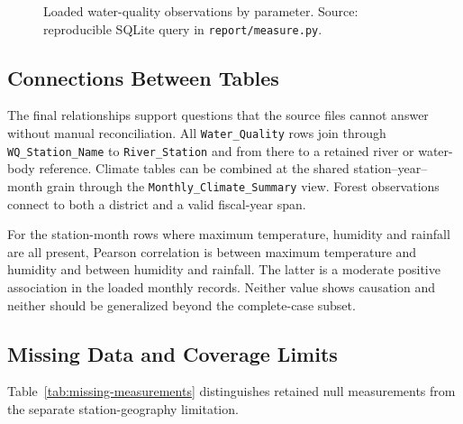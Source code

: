 \begin{figure}[H]
\centering
{}
\caption{Loaded water-quality observations by parameter. Source: reproducible
SQLite query in \texttt{report/measure.py}.}
\label{fig:water-quality-parameters}
\end{figure}

\subsection{Connections Between Tables}
\label{subsec:relationship-findings}

The final relationships support questions that the source files cannot answer
without manual reconciliation. All \mWaterQualityConnected{}
\texttt{Water\_Quality} rows join through \texttt{WQ\_Station\_Name} to
\texttt{River\_Station} and from there to a retained river or water-body
reference. Climate tables can be
combined at the shared station--year--month grain through the
\texttt{Monthly\_Climate\_Summary} view. Forest observations connect to both a
district and a valid fiscal-year span.

For the \mCompleteClimateRows{} station-month rows where maximum temperature,
humidity and rainfall are all present, Pearson correlation is
\mTempHumidityCorrelation{} between maximum temperature and humidity and
\mHumidityRainfallCorrelation{} between humidity and rainfall. The latter is a
moderate positive association in the loaded monthly records. Neither value
shows causation and neither should be generalized beyond the complete-case
subset.

\subsection{Missing Data and Coverage Limits}
\label{subsec:missing-findings}

Table~\ref{tab:missing-measurements} distinguishes retained null measurements
from the separate station-geography limitation.

